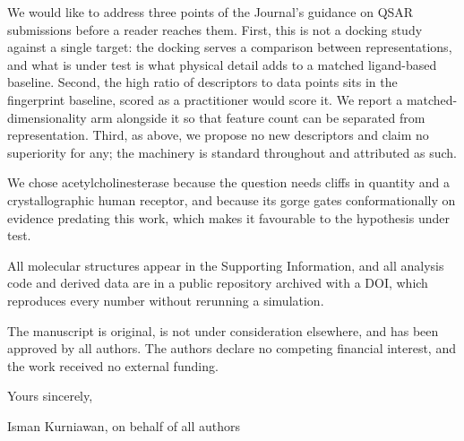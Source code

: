 \documentclass[11pt,letterpaper]{article}
\begin{document}
We would like to address three points of the Journal's guidance on QSAR submissions
before a reader reaches them. First, this is not a docking study against a single
target: the docking serves a comparison between representations, and what is under test
is what physical detail adds to a matched ligand-based baseline. Second, the high
ratio of descriptors to data points sits in the fingerprint baseline, scored as a
practitioner would score it. We report a matched-dimensionality arm alongside it so
that feature count can be separated from representation. Third, as above, we propose
no new descriptors and claim no superiority for any; the machinery is standard
throughout and attributed as such.

We chose acetylcholinesterase because the question needs cliffs in quantity and a
crystallographic human receptor, and because its gorge gates conformationally on
evidence predating this work, which makes it favourable to the hypothesis under test.

All molecular structures appear in the Supporting Information, and all analysis code
and derived data are in a public repository archived with a DOI, which reproduces every
number without rerunning a simulation.

The manuscript is original, is not under consideration elsewhere, and has been approved
by all authors. The authors declare no competing financial interest, and the work
received no external funding.

\noindent
Yours sincerely,

\noindent
Isman Kurniawan, on behalf of all authors
\end{document}
